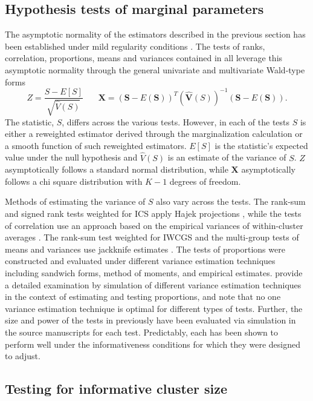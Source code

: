 \subsection{Hypothesis tests of marginal parameters} \label{ss:htest}
The asymptotic normality of the estimators described in the previous section has been established under mild regularity conditions \citep{datta05, datta08, williamson03}. The tests of ranks, correlation, proportions, means and variances contained in  all leverage this asymptotic normality through the general univariate and multivariate Wald-type forms
\begin{equation*} 
	Z = \frac{S-E\left[S\right]}{\sqrt{\hat{V}\left(S\right)}}~~~~~~~~
	\bm{X} = (\bm{S} - E(\bm{S}))^{T}\left(\hat{\bm{V}}(S)\right)^{-1}(\bm{S} - E(\bm{S})).
\end{equation*}
The statistic, $S$, differs across the various tests. However, in each of the tests $S$ is either a reweighted estimator derived through the marginalization calculation or a smooth function of such reweighted estimators. $E[S]$ is the statistic’s expected value under the null hypothesis and $\hat{V}\left(S\right)$ is an estimate of the variance of $S$. $Z$ asymptotically follows a standard normal distribution, while $\bm{X}$ asymptotically follows a chi square distribution with $K-1$ degrees of freedom.

Methods of estimating the variance of $S$ also vary across the tests. The rank-sum and signed rank tests weighted for ICS apply Hajek projections \citep{datta05, datta08}, while the tests of correlation use an approach based on the empirical variances of within-cluster averages \citep{lorenz11}. The rank-sum test weighted for IWCGS and the multi-group tests of means and variances use jackknife estimates \citep{dutta16, greggdis20}. The tests of proportions were constructed and evaluated under different variance estimation techniques including sandwich forms, method of moments, and empirical estimates. \citet{gregg20} provide a detailed examination by simulation of different variance estimation techniques in the context of estimating and testing proportions, and note that no one variance estimation technique is optimal for different types of tests. Further, the size and power of the tests in  previously have been evaluated via simulation in the source manuscripts for each test. Predictably, each has been shown to perform well under the informativeness conditions for which they were designed to adjust.

\subsection{Testing for informative cluster size} \label{ss:ICSTest}

